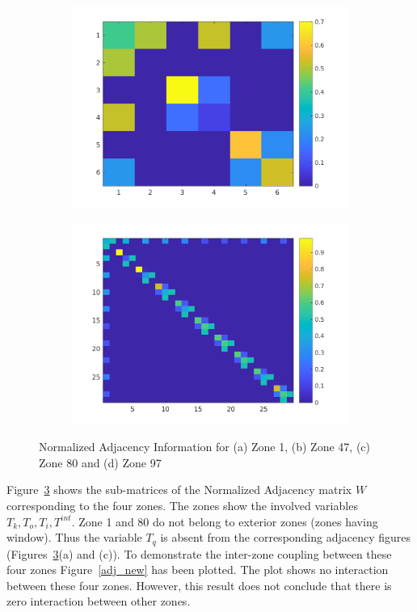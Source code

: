 \begin{figure}[H]
\begin{subfigure}{0.45\textwidth}
\includegraphics[width=\textwidth]{jbs_figures/adj_3}
\caption{}
\label{adj_3}
\end{subfigure}
\centering
\begin{subfigure}{0.45\textwidth}
\includegraphics[width=\textwidth]{jbs_figures/adj_4}
\caption{}
\label{adj_4}
\end{subfigure}
\caption{Normalized Adjacency Information for (a) Zone 1, (b) Zone 47, (c) Zone 80 and (d) Zone 97}
\label{fig:Zone_adjacency}
\end{figure}


Figure~\ref{fig:Zone_adjacency} shows the sub-matrices of the Normalized Adjacency matrix $W$ corresponding to the four zones. The zones show the involved variables $T_k,T_o,T_i,T^{int}$. Zone 1 and 80 do not belong to exterior zones (zones having window). Thus the variable $T_q$ is absent from the corresponding adjacency figures (Figures~\ref{fig:Zone_adjacency}(a) and (c)). To demonstrate the inter-zone coupling between these four zones Figure~\ref{adj_new} has been plotted. The plot shows no interaction between these four zones. However, this result does not conclude that there is zero interaction between other zones.

